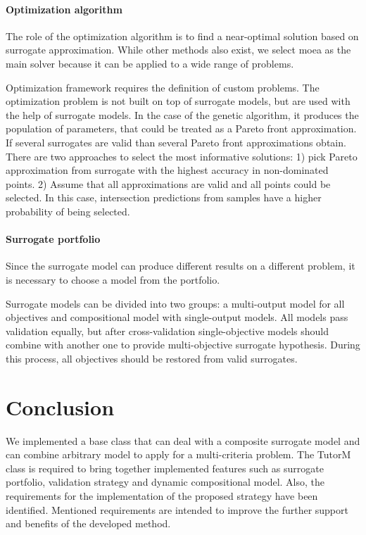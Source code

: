     \paragraph{Optimization algorithm}
        The role of the optimization algorithm is to find a near-optimal solution based on surrogate approximation. While other methods also exist, we select \gls{moea} as the main solver because it can be applied to a wide range of problems. 
       
        Optimization framework requires the definition of custom problems. The optimization problem is not built on top of surrogate models, but are used with the help of surrogate models. In the case of the genetic algorithm, it produces the population of parameters, that could be treated as a Pareto front approximation. If several surrogates are valid than several Pareto front approximations obtain. There are two approaches to select the most informative solutions: 1) pick Pareto approximation from surrogate with the highest accuracy in non-dominated points. 2) Assume that all approximations are valid and all points could be selected. In this case, intersection predictions from samples have a higher probability of being selected. 
        

    \paragraph{Surrogate portfolio}
    Since the surrogate model can produce different results on a different problem, it is necessary to choose a model from the portfolio.

    Surrogate models can be divided into two groups: a multi-output model for all objectives and compositional model with single-output models. All models pass validation equally, but after cross-validation single-objective models should combine with another one to provide multi-objective surrogate hypothesis. During this process, all objectives should be restored from valid surrogates. 




    \section*{Conclusion} 
    
    We implemented a base class that can deal with a composite surrogate model and can combine arbitrary model to apply for a multi-criteria problem. The TutorM class is required to bring together implemented features such as surrogate portfolio, validation strategy and dynamic compositional model. Also, the requirements for the implementation of the proposed strategy have been identified. Mentioned requirements are intended to improve the further support and benefits of the developed method.


